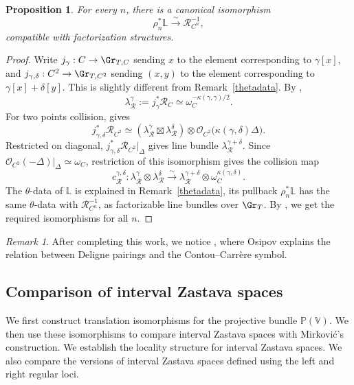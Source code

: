 \documentclass{amsart}
\numberwithin{equation}{section}
\numberwithin{figure}{section}
\newtheorem{prop}[thm]{Proposition}
\theoremstyle{definition}
\theoremstyle{remark}
\newtheorem{rmk}[thm]{Remark}
\renewcommand{\c}[1]{\mathcal{#1}}
\renewcommand{\b}[1]{\mathbb{#1}}
\begin{document}
\begin{prop}
	\label{prop:faltings-heisenberg-comparison}
	For every $n$, there is a canonical isomorphism 
	\[
	\rho_n^*\b L\xrightarrow{\sim}\c R_{C^n}^{-1},
	\]
	compatible with factorization structures.
\end{prop}
\begin{proof}
	Write \(j_\gamma:C\to \Gr_{T,C}\) sending $x$ to the element corresponding to \(\gamma[x]\), and \(j_{\gamma,\delta}: C^2\to \Gr_{T,C^2}\) sending $(x,y)$ to the element corresponding to \(\gamma[x]+\delta[y]\). This is slightly different from Remark~\ref{thetadata}.	By \cite[Lemma~17.1]{GaitsgoryCFT},
	\[
	\lambda_{\c R}^{\gamma}:=j_\gamma^*\c R_C
	\simeq \omega_C^{-\kappa(\gamma,\gamma)/2}.
	\]
	For two points collision, \cite[Lemma~17.3]{GaitsgoryCFT} gives
	\[
	j_{\gamma,\delta}^*\c R_{C^2}
	\simeq
	(\lambda_{\c R}^{\gamma}\boxtimes\lambda_{\c R}^{\delta})
	\otimes\c O_{C^2}\bigl(\kappa(\gamma,\delta)\Delta\bigr).
	\]
	Restricted on diagonal, $j_{\gamma,\delta}^*\c R_{C^2}|_{\Delta}$ gives line bundle	\(\lambda_{\c R}^{\gamma+\delta}\).
	 Since
	\(\c O_{C^2}(-\Delta)|_\Delta\simeq\omega_C\), restriction of this
	isomorphism gives the collision map
	\[
	c_{\c R}^{\gamma,\delta}\colon
	\lambda_{\c R}^{\gamma}\otimes\lambda_{\c R}^{\delta}
	\xrightarrow{\sim}
	\lambda_{\c R}^{\gamma+\delta}\otimes\omega_C^{\kappa(\gamma,\delta)}.
	\]
	The $\theta$-data of $\b L$ is explained in	Remark~\ref{thetadata},  its pullback $\rho_n^*\b L$ has the same $\theta$-data with $\c R_{C^n}^{-1}$, as factorizable line bundles over $\Gr_T$. By \cite[Lemma~1.3 and Proposition~1.4]{tao2021central}, we get the required isomorphisms for all \(n\).
\end{proof}
\begin{rmk}
	After completing this work, we notice
	\cite[Theorems~6.1--6.3]{osipov2026contou}, where Osipov
	explains the relation between Deligne pairings and the
	Contou--Carr\`ere symbol.
\end{rmk}

\subsection{Comparison of interval Zastava spaces}
We first construct translation isomorphisms for the
projective bundle $\b P(\b V)$.
We then use these isomorphisms to compare interval
Zastava spaces with Mirkovi\'c's construction.
We establish the locality structure for interval Zastava spaces.
We also compare the versions of interval Zastava spaces
defined using the left and right regular loci.
\end{document}
